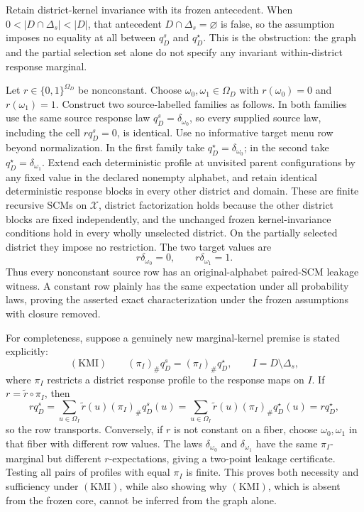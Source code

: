 Retain district-kernel invariance with its frozen antecedent.  When
\(
 0<|D\cap\Delta_s|<|D|
\), that antecedent \(D\cap\Delta_s=\varnothing\) is false, so the assumption imposes no equality at all between \(q_D^s\) and \(q_D^\star\).  This is the obstruction: the graph and the partial selection set alone do not specify any invariant within-district response marginal.

Let \(r\in\{0,1\}^{\Omega_D}\) be nonconstant.  Choose \(\omega_0,\omega_1\in\Omega_D\) with \(r(\omega_0)=0\) and \(r(\omega_1)=1\).  Construct two source-labelled families as follows.  In both families use the same source response law \(q_D^s=\delta_{\omega_0}\), so every supplied source law, including the cell \(rq_D^s=0\), is identical.  Use no informative target menu row beyond normalization.  In the first family take \(q_D^\star=\delta_{\omega_0}\); in the second take \(q_D^\star=\delta_{\omega_1}\).  Extend each deterministic profile at unvisited parent configurations by any fixed value in the declared nonempty alphabet, and retain identical deterministic response blocks in every other district and domain.  These are finite recursive SCMs on \(\mathcal X\), district factorization holds because the other district blocks are fixed independently, and the unchanged frozen kernel-invariance conditions hold in every wholly unselected district.  On the partially selected district they impose no restriction.  The two target values are
\[
 r\delta_{\omega_0}=0,
 \qquad r\delta_{\omega_1}=1.
\]
Thus every nonconstant source row has an original-alphabet paired-SCM leakage witness.  A constant row plainly has the same expectation under all probability laws, proving the asserted exact characterization under the frozen assumptions with closure removed.

For completeness, suppose a genuinely new marginal-kernel premise is stated explicitly:
\[
 (\mathrm{KMI})\qquad (\pi_I)_\#q_D^s=(\pi_I)_\#q_D^\star,
 \qquad I=D\setminus\Delta_s,
\]
where \(\pi_I\) restricts a district response profile to the response maps on \(I\).  If \(r=\widetilde r\circ\pi_I\), then
\[
 rq_D^s
 =\sum_{u\in\Omega_I}\widetilde r(u)(\pi_I)_\#q_D^s(u)
 =\sum_{u\in\Omega_I}\widetilde r(u)(\pi_I)_\#q_D^\star(u)
 =rq_D^\star,
\]
so the row transports.  Conversely, if \(r\) is not constant on a fiber, choose \(\omega_0,\omega_1\) in that fiber with different row values.  The laws \(\delta_{\omega_0}\) and \(\delta_{\omega_1}\) have the same \(\pi_I\)-marginal but different \(r\)-expectations, giving a two-point leakage certificate.  Testing all pairs of profiles with equal \(\pi_I\) is finite.  This proves both necessity and sufficiency under \((\mathrm{KMI})\), while also showing why \((\mathrm{KMI})\), which is absent from the frozen core, cannot be inferred from the graph alone.